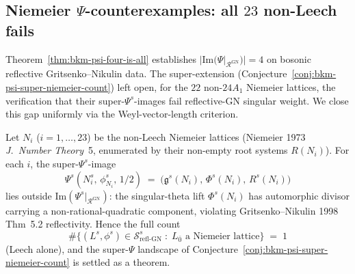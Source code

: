 \subsection{Niemeier \texorpdfstring{$\Psi$}{Psi}-counterexamples: all $23$ non-Leech fails}
\label{subsec:k3ebkm-niemeier-counterexamples}

Theorem~\ref{thm:bkm-psi-four-is-all} establishes
$|\mathrm{Im}(\Psi|_{\mathcal R^{\mathrm{GN}}})| = 4$ on bosonic
reflective Gritsenko--Nikulin data. The super-extension
(Conjecture~\ref{conj:bkm-psi-super-niemeier-count}) left open,
for the $22$ non-$24A_1$ Niemeier lattices, the verification that
their super-$\Psi^s$-images fail reflective-GN singular weight. We
close this gap uniformly via the Weyl-vector-length criterion.

\begin{theorem}
\label{thm:k3ebkm-niemeier-counterexamples-all}
Let $N_i$ ($i = 1,\ldots,23$) be the non-Leech Niemeier lattices
(Niemeier 1973 \emph{J.\ Number Theory}~5, enumerated by their
non-empty root systems $R(N_i)$). For each $i$, the super-$\Psi^s$-image
\[
 \Psi^s(N_i^s,\,\phi^s_{N_i},\,1/2)
 \;=\;
 \bigl(\mathfrak g^s(N_i),\,\Phi^s(N_i),\,R^s(N_i)\bigr)
\]
lies outside $\mathrm{Im}(\Psi^s|_{\mathcal R^{\mathrm{GN}}})$: the
singular-theta lift $\Phi^s(N_i)$ has automorphic divisor carrying a
non-rational-quadratic component, violating
Gritsenko--Nikulin 1998 Thm~5.2 reflectivity. Hence the full count
\[
 \#\bigl\{(L^s,\phi^s)\in\mathcal S^s_{\mathrm{refl\text{-}GN}}\;:\;
 L_{\bar 0}\text{ a Niemeier lattice}\bigr\}\;=\;1
\]
(Leech alone), and the super-$\Psi$ landscape of
Conjecture~\ref{conj:bkm-psi-super-niemeier-count} is settled as a
theorem.
\end{theorem}

